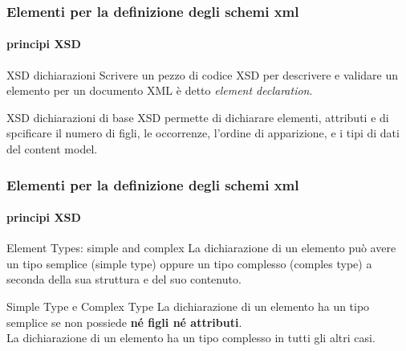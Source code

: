 \begin{frame}
    \frametitle{Elementi per la definizione degli schemi xml}
    \framesubtitle{principi XSD}
    \addtocounter{nframe}{1}

    \begin{block}{XSD dichiarazioni}
       Scrivere un pezzo di codice XSD per descrivere e validare un elemento per un documento XML è detto \textit{element declaration}.
    \end{block}

    \begin{block}{XSD dichiarazioni di base}
        XSD permette di dichiarare elementi, attributi e di spcificare il numero di figli, le occorrenze, l'ordine di apparizione, e i tipi di dati del content model.
    \end{block}
    
\end{frame}


\begin{frame}
    \frametitle{Elementi per la definizione degli schemi xml}
    \framesubtitle{principi XSD}
    \addtocounter{nframe}{1}

    \begin{block}{Element Types: simple and complex}
        La dichiarazione di un elemento può avere un tipo semplice (simple type) oppure un tipo complesso (comples type) a seconda della sua struttura e del suo contenuto.


    \end{block}

    \begin{block}{Simple Type e Complex Type}
        La dichiarazione di un elemento ha un tipo semplice se non possiede \textbf{né figli né attributi}.
        \\ La dichiarazione di un elemento ha un tipo complesso in tutti gli altri casi.
    \end{block}
    
\end{frame}


